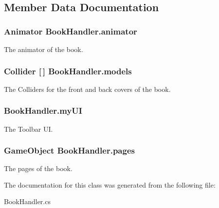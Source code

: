 \subsection{Member Data Documentation}
\subsubsection[{animator}]{\setlength{\rightskip}{0pt plus 5cm}Animator Book\+Handler.\+animator}\label{class_book_handler_aee55e4d0b6978567f3b9fe7ced515631}


The animator of the book. 

\subsubsection[{models}]{\setlength{\rightskip}{0pt plus 5cm}Collider [$\,$] Book\+Handler.\+models}\label{class_book_handler_a3e0579bd892b63ba3fad5b7284df1774}


The Colliders for the front and back covers of the book. 

\subsubsection[{my\+UI}]{ Book\+Handler.\+my\+UI}\label{class_book_handler_aafcf17dc285ab162e349fe84b1ba119b}


The Toolbar UI. 

\subsubsection[{pages}]{\setlength{\rightskip}{0pt plus 5cm}Game\+Object Book\+Handler.\+pages}\label{class_book_handler_ac559d4edb6409bd60793a9e94e02f67a}


The pages of the book. 



The documentation for this class was generated from the following file\+:\begin{DoxyCompactItemize}
\item 
Book\+Handler.\+cs\end{DoxyCompactItemize}
